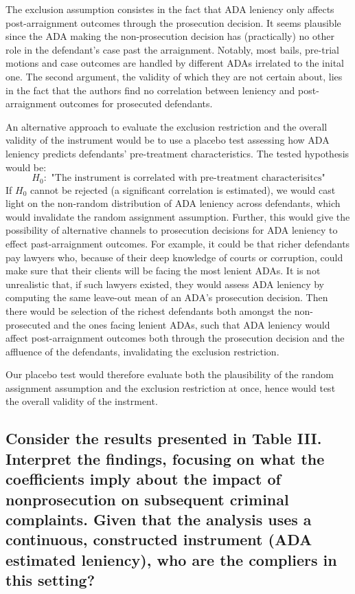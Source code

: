 \documentclass{article}
\begin{document}
The exclusion assumption consistes in the fact that ADA leniency only affects post-arraignment outcomes through the prosecution decision. It seems plausible since the ADA making the non-prosecution decision has (practically) no other role in the defendant's case past the arraignment. Notably, most bails, pre-trial motions and case outcomes are handled by different ADAs irrelated to the inital one. The second argument, the validity of which they are not certain about, lies in the fact that the authors find no correlation between leniency and post-arraignment outcomes for prosecuted defendants.

An alternative approach to evaluate the exclusion restriction and the overall validity of the instrument would be to use a placebo test assessing how ADA leniency predicts defendants' pre-treatment characteristics. The tested hypothesis would be:
\[H_0: \text{ "The instrument is correlated with pre-treatment characterisitcs"}\]
If \(H_0\) cannot be rejected (a significant correlation is estimated), we would cast light on the non-random distribution of ADA leniency across defendants, which would invalidate the random assignment assumption. Further, this would give the possibility of alternative channels to prosecution decisions for ADA leniency to effect past-arraignment outcomes. For example, it could be that richer defendants pay lawyers who, because of their deep knowledge of courts or corruption, could make sure that their clients will be facing the most lenient ADAs. It is not unrealistic that, if such lawyers existed, they would assess ADA leniency by computing the same leave-out mean of an ADA's prosecution decision. Then there would be selection of the richest defendants both amongst the non-prosecuted and the ones facing lenient ADAs, such that ADA leniency would affect post-arraignment outcomes both through the prosecution decision and the affluence of the defendants, invalidating the exclusion restriction.

Our placebo test would therefore evaluate both the plausibility of the random assignment assumption and the exclusion restriction at once, hence would test the overall validity of the instrment.

\subsection{Consider the results presented in Table III. Interpret the findings, focusing on what the coefficients imply about the impact of nonprosecution on subsequent criminal complaints. Given that the analysis uses a continuous, constructed instrument (ADA estimated leniency), who are the compliers in this setting?}
\end{document}
